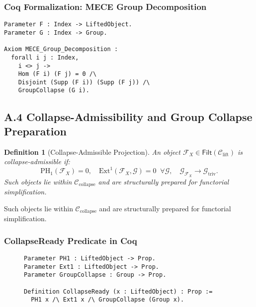 \documentclass[11pt]{article}
\newtheorem{definition}[theorem]{Definition}
\begin{document}
\subsubsection*{Coq Formalization: MECE Group Decomposition}
\begin{lstlisting}[language=Coq, caption=Group-Compatible MECE Decomposition]
Parameter F : Index -> LiftedObject.
Parameter G : Index -> Group.

Axiom MECE_Group_Decomposition :
  forall i j : Index,
    i <> j ->
    Hom (F i) (F j) = 0 /\
    Disjoint (Supp (F i)) (Supp (F j)) /\
    GroupCollapse (G i).
\end{lstlisting}


\subsection*{A.4 Collapse-Admissibility and Group Collapse Preparation}

\begin{definition}[Collapse-Admissible Projection]
An object \( \mathcal{F}_X \in \mathsf{Filt}(\mathcal{C}_{\mathrm{lift}}) \) is \emph{collapse-admissible} if:
\[
\mathrm{PH}_1(\mathcal{F}_X) = 0, \quad \mathrm{Ext}^1(\mathcal{F}_X, \mathcal{G}) = 0 \;\; \forall \mathcal{G}, \quad \mathcal{G}_{\mathcal{F}_X} \longrightarrow \mathcal{G}_{\mathrm{triv}}.
\]
Such objects lie within \( \mathcal{C}_{\mathrm{collapse}} \) and are structurally prepared for functorial simplification.
\end{definition}


Such objects lie within \( \mathcal{C}_{\mathrm{collapse}} \) and are structurally prepared for functorial simplification.

\subsubsection*{CollapseReady Predicate in Coq}

\begin{figure}[h]
\centering
\begin{lstlisting}[language=Coq, caption=Collapse-Readiness Predicate]
Parameter PH1 : LiftedObject -> Prop.
Parameter Ext1 : LiftedObject -> Prop.
Parameter GroupCollapse : Group -> Prop.

Definition CollapseReady (x : LiftedObject) : Prop :=
  PH1 x /\ Ext1 x /\ GroupCollapse (Group x).
\end{lstlisting}
\end{figure}
\end{document}
